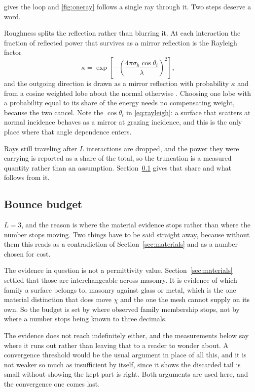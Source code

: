  gives the loop and \cref{fig:oneray} follows a single ray
through it. Two steps deserve a word.

Roughness splits the reflection rather than blurring it. At each interaction the
fraction of reflected power that survives as a mirror reflection is the Rayleigh
factor
\begin{equation}
  \kappa = \exp\!\left[ -\left( \frac{4\pi \sigma_h \cos\theta_i}{\lambda}
  \right)^{\!2} \right] ,
  \label{eq:rayleigh}
\end{equation}
and the outgoing direction is drawn as a mirror reflection with probability
$\kappa$ and from a cosine weighted lobe about the normal otherwise
\cite{beckmann}. Choosing one lobe with a probability equal to its share of the
energy needs no compensating weight, because the two cancel. Note the
$\cos\theta_i$ in \eqref{eq:rayleigh}: a surface that scatters at normal
incidence behaves as a mirror at grazing incidence, and this is the only place
where that angle dependence enters.

Rays still traveling after $L$ interactions are dropped, and the power they
were carrying is reported as a share of the total, so the truncation is a
measured quantity rather than an assumption. Section~\ref{sec:budget} gives that
share and what follows from it.

\subsection{Bounce budget}
\label{sec:budget}

$L = 3$, and the reason is where the material evidence stops rather than where
the number stops moving. Two things have to be said straight away, because
without them this reads as a contradiction of
Section~\ref{sec:materials} and as a number chosen for cost.

The evidence in question is not a permittivity value.
Section~\ref{sec:materials} settled that those are interchangeable across
masonry. It is evidence of which family a surface belongs to, masonry against
glass or metal, which is the one material distinction that does move $\chi$ and
the one the mesh cannot supply on its own. So the budget is set by where
observed family membership stops, not by where a number stops being known to
three decimals.

The evidence does not reach indefinitely either, and the measurements below say
where it runs out rather than leaving that to a reader to wonder about. A
convergence threshold would be the usual argument in place of all this, and it is
not weaker so much as insufficient by itself, since it shows the discarded tail
is small without showing the kept part is right. Both arguments are used here,
and the convergence one comes last.

